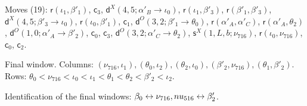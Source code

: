\documentclass[11pt]{amsart}
\theoremstyle{definition}
\theoremstyle{remark}
\begin{document}
\noindent Moves (19): $\mathsf{r}(\iota_1,\beta'_1)$, $\mathsf{c}_{3}$, $\mathsf{d}^{X}(4,5;\alpha'_B\to\iota_0)$, $\mathsf{r}(\iota_1,\beta'_3)$, $\mathsf{r}(\beta'_1,\beta'_3)$, $\mathsf{d}^{X}(4,5;\beta'_3\to\iota_0)$, $\mathsf{r}(\iota_0,\beta'_1)$, $\mathsf{c}_{1}$, $\mathsf{d}^{O}(3,2;\beta'_1\to\theta_0)$, $\mathsf{r}(\alpha'_A,\alpha'_C)$, $\mathsf{r}(\alpha'_A,\theta_2)$, $\mathsf{d}^{O}(1,0;\alpha'_A\to\beta'_2)$, $\mathsf{c}_{0}$, $\mathsf{c}_{3}$, $\mathsf{d}^{O}(3,2;\alpha'_C\to\theta_2)$, $\mathsf{s}^{X}(1,L,b;\nu_{716})$, $\mathsf{r}(\iota_0,\nu_{716})$, $\mathsf{c}_{0}$, $\mathsf{c}_{2}$.\par
\noindent Final window. Columns: $(\nu_{716},\iota_1),\allowbreak (\theta_0,\iota_2),\allowbreak (\theta_2,\iota_0),\allowbreak (\beta'_2,\nu_{716}),\allowbreak (\theta_1,\beta'_2)$.\\ Rows: $\theta_0 <\allowbreak \nu_{716} <\allowbreak \iota_0 <\allowbreak \iota_1 <\allowbreak \theta_1 <\allowbreak \theta_2 <\allowbreak \beta'_2 <\allowbreak \iota_2$.\par\medskip
\noindent Identification of the final windows: $\beta_0\leftrightarrow \nu_{716},\allowbreak \\nu_{516}\leftrightarrow \beta'_2$.\par\bigskip
\end{document}
